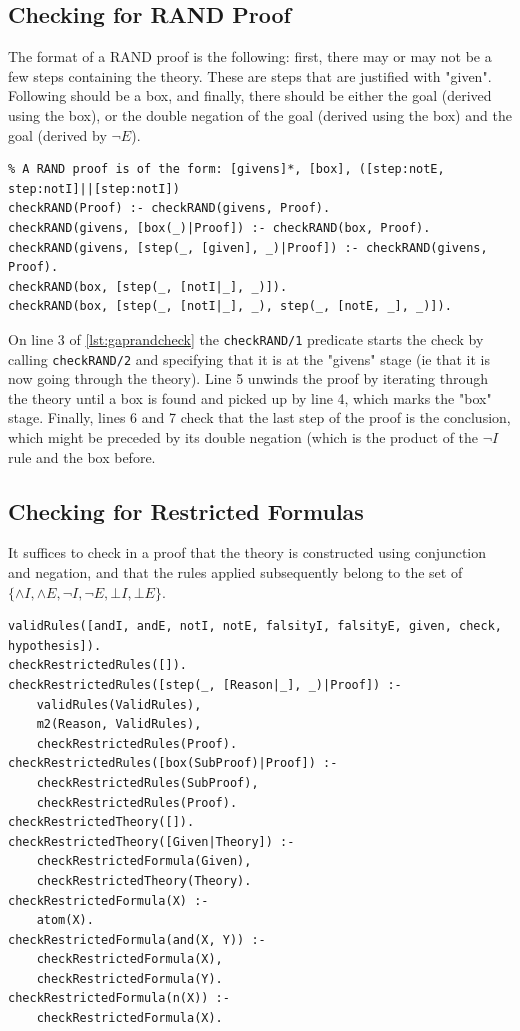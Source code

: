 \documentclass[11pt,twoside,a4paper]{report}
\begin{document}
\subsection{Checking for RAND Proof}
The format of a RAND proof is the following: first, there may or may not be a few steps containing the theory. These are steps that are justified with "given". Following should be a box, and finally, there should be either the goal (derived using the box), or the double negation of the goal (derived using the box) and the goal (derived by $\neg E$).

\begin{lstlisting}[caption={Checking whether a proof is a RAND proof},label=lst:gaprandcheck]
% Checks to see if this proof is a RAND proof to start with
% A RAND proof is of the form: [givens]*, [box], ([step:notE, step:notI]||[step:notI])
checkRAND(Proof) :- checkRAND(givens, Proof).
checkRAND(givens, [box(_)|Proof]) :- checkRAND(box, Proof).
checkRAND(givens, [step(_, [given], _)|Proof]) :- checkRAND(givens, Proof).
checkRAND(box, [step(_, [notI|_], _)]).
checkRAND(box, [step(_, [notI|_], _), step(_, [notE, _], _)]).
\end{lstlisting}

On line 3 of \autoref{lst:gaprandcheck} the \lstinline$checkRAND/1$ predicate starts the check by calling \lstinline$checkRAND/2$ and specifying that it is at the "givens" stage (ie that it is now going through the theory). Line 5 unwinds the proof by iterating through the theory until a box is found and picked up by line 4, which marks the "box" stage. Finally, lines 6 and 7 check that the last step of the proof is the conclusion, which might be preceded by its double negation (which is the product of the $\neg I$ rule and the box before.

\subsection{Checking for Restricted Formulas}
It suffices to check in a proof that the theory is constructed using conjunction and negation, and that the rules applied subsequently belong to the set of $\{\wedge I, \wedge E, \neg I, \neg E, \bot I, \bot E\}$.

\begin{lstlisting}[caption={Checking whether a proof uses only conjunction and negation},label=lst:gaprestrictedcheck]
% Checks to see if the proof consists of ruleset defined over argumentation logic
validRules([andI, andE, notI, notE, falsityI, falsityE, given, check, hypothesis]).
checkRestrictedRules([]).
checkRestrictedRules([step(_, [Reason|_], _)|Proof]) :- 
	validRules(ValidRules), 
	m2(Reason, ValidRules), 
	checkRestrictedRules(Proof).
checkRestrictedRules([box(SubProof)|Proof]) :-
	checkRestrictedRules(SubProof),
	checkRestrictedRules(Proof).
checkRestrictedTheory([]).
checkRestrictedTheory([Given|Theory]) :-
	checkRestrictedFormula(Given),
	checkRestrictedTheory(Theory).
checkRestrictedFormula(X) :- 
	atom(X).
checkRestrictedFormula(and(X, Y)) :-
	checkRestrictedFormula(X),
	checkRestrictedFormula(Y).
checkRestrictedFormula(n(X)) :-
	checkRestrictedFormula(X).
\end{lstlisting}
\end{document}
